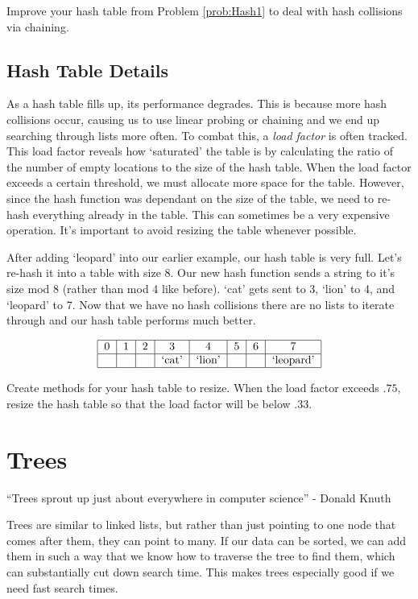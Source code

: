 \begin{problem}
Improve your hash table from Problem \ref{prob:Hash1} to deal with hash collisions via chaining.
\end{problem}

\subsection*{Hash Table Details}
As a hash table fills up, its performance degrades.
This is because more hash collisions occur, causing us to use linear probing or chaining and we end up searching through lists more often.
To combat this, a \emph{load factor} is often tracked.
This load factor reveals how `saturated' the table is by calculating the ratio of the number of empty locations to the size of the hash table.
When the load factor exceeds a certain threshold, we must allocate more space for the table.
However, since the hash function was dependant on the size of the table, we need to re-hash everything already in the table.
This can sometimes be a very expensive operation.
It's important to avoid resizing the table whenever possible.

After adding `leopard' into our earlier example, our hash table is very full. Let's re-hash it into a table with size 8.
Our new hash function sends a string to it's size mod 8 (rather than mod 4 like before).
`cat' gets sent to 3, `lion' to 4, and `leopard' to 7.
Now that we have no hash collisions there are no lists to iterate through and our hash table performs much better.

\[
\begin{tabular}{|c|c|c|c|c|c|c|c|}
\hline
0 & 1 & 2 & 3 & 4 & 5 & 6 & 7 \\
\hline
 & & & `cat' & `lion' & & &`leopard' \\
\hline
\end{tabular}
\]

\begin{problem}
Create methods for your hash table to resize.
When the load factor exceeds $.75$, resize the hash table so that the load factor will be below $.33$.
\label{prob:Hash3}
\end{problem}

\section*{Trees}
``Trees sprout up just about everywhere in computer science'' - Donald Knuth

Trees are similar to linked lists, but rather than just pointing to one node that comes after them, they can point to many.
If our data can be sorted, we can add them in such a way that we know how to traverse the tree to find them, which can substantially cut down search time.
This makes trees especially good if we need fast search times.

